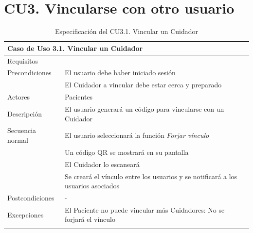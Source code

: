 \section{CU3. Vincularse con otro usuario}
\label{sec:cu:vinculacion}

\begin{longtable}{|p{} p{}|}
    \hline
    \multicolumn{2}{|l|}{\textbf{Caso de Uso 3.1. Vincular un Cuidador}} \\ \hline \hline
    Requisitos          & {req:vinculo_paciente} \\ \hline
    Precondiciones      & El usuario debe haber iniciado sesión \\
                        & El Cuidador a vincular debe estar cerca y preparado \\ \hline
    Actores             & Pacientes \\ \hline
    Descripción         & El usuario generará un código para vincularse con un Cuidador \\ \hline
    Secuencia normal    & El usuario seleccionará la función \emph{Forjar vínculo} \\
                        & Un código QR se mostrará en su pantalla \\
                        & El Cuidador lo escaneará \\
                        & Se creará el vínculo entre los usuarios y se notificará a los usuarios asociados \\ \hline
    Postcondiciones     & - \\ \hline
    Excepciones         & El Paciente no puede vincular más Cuidadores: No se forjará el vínculo \\ \hline
    \caption{Especificación del CU3.1. Vincular un Cuidador}
    \label{cu:vincular_cuidador}
\end{longtable}

